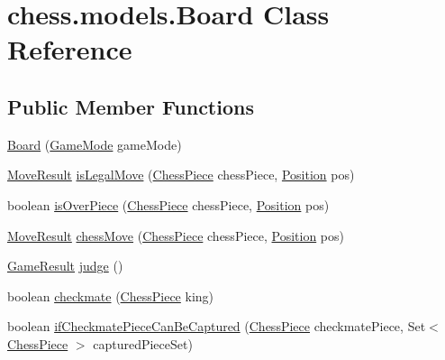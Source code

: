 \hypertarget{classchess_1_1models_1_1_board}{}\section{chess.\+models.\+Board Class Reference}
\label{classchess_1_1models_1_1_board}
\subsection*{Public Member Functions}
\begin{DoxyCompactItemize}
\item 
\mbox{\hyperlink{classchess_1_1models_1_1_board_aa18d91c193768584a714d739a0dc80af}{Board}} (\mbox{\hyperlink{enumchess_1_1models_1_1enums_1_1_game_mode}{Game\+Mode}} game\+Mode)
\item 
\mbox{\hyperlink{enumchess_1_1models_1_1enums_1_1_move_result}{Move\+Result}} \mbox{\hyperlink{classchess_1_1models_1_1_board_a2514b6b830efc0aeeb2ba6f64aa033e2}{is\+Legal\+Move}} (\mbox{\hyperlink{classchess_1_1models_1_1_chess_piece}{Chess\+Piece}} chess\+Piece, \mbox{\hyperlink{classchess_1_1models_1_1_position}{Position}} pos)
\item 
boolean \mbox{\hyperlink{classchess_1_1models_1_1_board_a8ffee6403d98b5e5e68c0a2b73440100}{is\+Over\+Piece}} (\mbox{\hyperlink{classchess_1_1models_1_1_chess_piece}{Chess\+Piece}} chess\+Piece, \mbox{\hyperlink{classchess_1_1models_1_1_position}{Position}} pos)
\item 
\mbox{\hyperlink{enumchess_1_1models_1_1enums_1_1_move_result}{Move\+Result}} \mbox{\hyperlink{classchess_1_1models_1_1_board_a013a001cb8edfdd61272275d210609fd}{chess\+Move}} (\mbox{\hyperlink{classchess_1_1models_1_1_chess_piece}{Chess\+Piece}} chess\+Piece, \mbox{\hyperlink{classchess_1_1models_1_1_position}{Position}} pos)
\item 
\mbox{\hyperlink{enumchess_1_1models_1_1enums_1_1_game_result}{Game\+Result}} \mbox{\hyperlink{classchess_1_1models_1_1_board_a7e3f69e82d8337f3cf6109913e5335d3}{judge}} ()
\item 
boolean \mbox{\hyperlink{classchess_1_1models_1_1_board_a7268e3609f458bc8acd92b43727ca63d}{checkmate}} (\mbox{\hyperlink{classchess_1_1models_1_1_chess_piece}{Chess\+Piece}} king)
\item 
boolean \mbox{\hyperlink{classchess_1_1models_1_1_board_a235a8cac7cd2b48fb81165fbedb386e8}{if\+Checkmate\+Piece\+Can\+Be\+Captured}} (\mbox{\hyperlink{classchess_1_1models_1_1_chess_piece}{Chess\+Piece}} checkmate\+Piece, Set$<$ \mbox{\hyperlink{classchess_1_1models_1_1_chess_piece}{Chess\+Piece}} $>$ captured\+Piece\+Set)

\end{DoxyCompactItemize}
